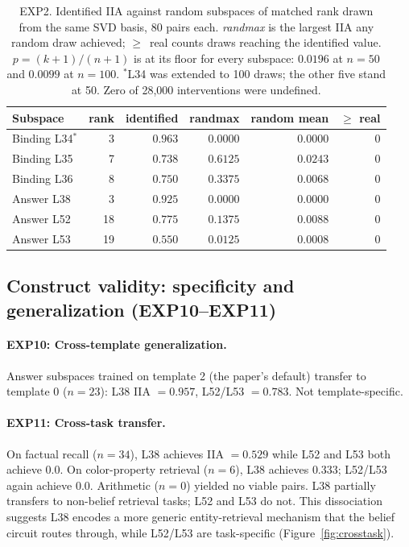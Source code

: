 \documentclass{article}
\begin{document}
\begin{table}[t]
\centering
\small
\caption{EXP2. Identified IIA against random subspaces of matched rank drawn from the same
SVD basis, 80 pairs each. \emph{randmax} is the largest IIA any random draw achieved;
$\ge$~real counts draws reaching the identified value. $p = (k+1)/(n+1)$ is at its floor for
every subspace: $0.0196$ at $n = 50$ and $0.0099$ at $n = 100$. $^{\ast}$L34 was extended to
100 draws; the other five stand at 50. Zero of 28{,}000 interventions were undefined.}
\label{tab:baseline}
\vspace{0.5\baselineskip}
\begin{tabular}{lrrrrr}
\toprule
Subspace & rank & identified & randmax & random mean & $\ge$ real \\
\midrule
Binding L34$^{\ast}$ & 3 & $0.963$ & $0.0000$ & $0.0000$ & 0 \\
Binding L35 & 7 & $0.738$ & $0.6125$ & $0.0243$ & 0 \\
Binding L36 & 8 & $0.750$ & $0.3375$ & $0.0068$ & 0 \\
Answer L38 & 3 & $0.925$ & $0.0000$ & $0.0000$ & 0 \\
Answer L52 & 18 & $0.775$ & $0.1375$ & $0.0088$ & 0 \\
Answer L53 & 19 & $0.550$ & $0.0125$ & $0.0008$ & 0 \\
\bottomrule
\end{tabular}
\end{table}

\subsection{Construct validity: specificity and generalization (EXP10--EXP11)}

\paragraph{EXP10: Cross-template generalization.}
Answer subspaces trained on template 2 (the paper's default) transfer to template 0 ($n = 23$): L38 IIA $= 0.957$, L52/L53 $= 0.783$. Not template-specific.

\paragraph{EXP11: Cross-task transfer.}
On factual recall ($n = 34$), L38 achieves IIA $= 0.529$ while L52 and L53 both achieve $0.0$. On color-property retrieval ($n = 6$), L38 achieves $0.333$; L52/L53 again achieve $0.0$. Arithmetic ($n = 0$) yielded no viable pairs. L38 partially transfers to non-belief retrieval tasks; L52 and L53 do not. This dissociation suggests L38 encodes a more generic entity-retrieval mechanism that the belief circuit routes through, while L52/L53 are task-specific (Figure~\ref{fig:crosstask}).
\end{document}
